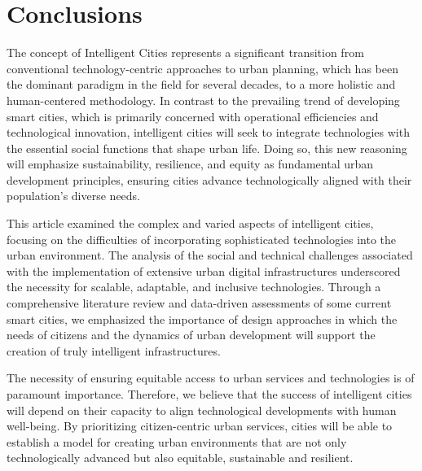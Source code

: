 \documentclass[smartcities,article,submit,pdftex,moreauthors]{Definitions/mdpi}
\begin{document}
\section{Conclusions}
\label{sec:conclusion}

The concept of Intelligent Cities represents a significant transition from conventional technology-centric approaches to urban planning, which has been the dominant paradigm in the field for several decades, to a more holistic and human-centered methodology. In contrast to the prevailing trend of developing smart cities, which is primarily concerned with operational efficiencies and technological innovation, intelligent cities will seek to integrate technologies with the essential social functions that shape urban life. Doing so, this new reasoning will emphasize sustainability, resilience, and equity as fundamental urban development principles, ensuring cities advance technologically aligned with their population's diverse needs.

This article examined the complex and varied aspects of intelligent cities, focusing on the difficulties of incorporating sophisticated technologies into the urban environment. The analysis of the social and technical challenges associated with the implementation of extensive urban digital infrastructures underscored the necessity for scalable, adaptable, and inclusive technologies. Through a comprehensive literature review and data-driven assessments of some current smart cities, we emphasized the importance of design approaches in which the needs of citizens and the dynamics of urban development will support the creation of truly intelligent infrastructures. 

The necessity of ensuring equitable access to urban services and technologies is of paramount importance. Therefore, we believe that the success of intelligent cities will depend on their capacity to align technological developments with human well-being. By prioritizing citizen-centric urban services, cities will be able to establish a model for creating urban environments that are not only technologically advanced but also equitable, sustainable and resilient. 

\vspace{6pt} 


\end{document}
